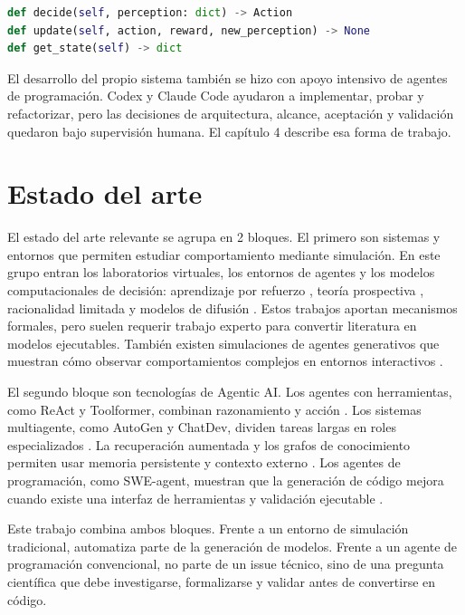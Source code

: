 \begin{lstlisting}[language=Python]
def decide(self, perception: dict) -> Action
def update(self, action, reward, new_perception) -> None
def get_state(self) -> dict
\end{lstlisting}

El desarrollo del propio sistema también se hizo con apoyo intensivo de agentes
de programación. Codex y Claude Code ayudaron a implementar, probar y
refactorizar, pero las decisiones de arquitectura, alcance, aceptación y
validación quedaron bajo supervisión humana. El capítulo 4 describe esa forma
de trabajo.

\section{Estado del arte}

El estado del arte relevante se agrupa en 2 bloques. El primero son sistemas y
entornos que permiten estudiar comportamiento mediante simulación. En este
grupo entran los laboratorios virtuales, los entornos de agentes y los modelos
computacionales de decisión: aprendizaje por refuerzo \cite{sutton2018rl},
teoría prospectiva \cite{kahneman1979prospect}, racionalidad limitada
\cite{simon1955behavioral} y modelos de difusión \cite{ratcliff1978theory}.
Estos trabajos aportan mecanismos formales, pero suelen requerir trabajo
experto para convertir literatura en modelos ejecutables.
También existen simulaciones de agentes generativos que muestran cómo observar
comportamientos complejos en entornos interactivos \cite{park2023generativeagents}.

El segundo bloque son tecnologías de Agentic AI. Los agentes con herramientas,
como ReAct y Toolformer, combinan razonamiento y acción
\cite{yao2023react,schick2023toolformer}. Los sistemas multiagente, como
AutoGen y ChatDev, dividen tareas largas en roles especializados
\cite{wu2023autogen,qian2024chatdev}. La recuperación aumentada y los grafos de
conocimiento permiten usar memoria persistente y contexto externo
\cite{lewis2020rag,edge2024graphrag}. Los agentes de programación, como
SWE-agent, muestran que la generación de código mejora cuando existe una
interfaz de herramientas y validación ejecutable \cite{yang2024sweagent}.

Este trabajo combina ambos bloques. Frente a un entorno de simulación
tradicional, automatiza parte de la generación de modelos. Frente a un agente de
programación convencional, no parte de un issue técnico, sino de una pregunta
científica que debe investigarse, formalizarse y validar antes de convertirse
en código.

